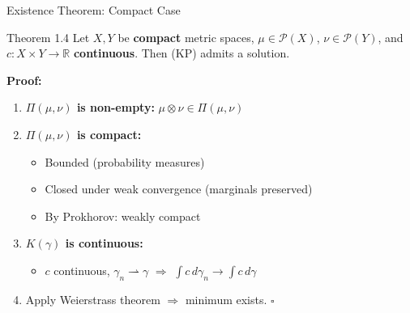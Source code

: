 \documentclass[aspectratio=169]{beamer}
\newcommand{\R}{\mathbb{R}}
\newcommand{\Pp}{\mathcal{P}}
\begin{document}
\begin{frame}{Existence Theorem: Compact Case}
\begin{block}{Theorem 1.4}
Let $X, Y$ be \textbf{compact} metric spaces, $\mu \in \Pp(X)$, $\nu \in \Pp(Y)$, and $c: X \times Y \to \R$ \textbf{continuous}. Then (KP) admits a solution.
\end{block}

\vspace{0.3cm}
\textbf{Proof:}
\begin{enumerate}
    \item \textbf{$\Pi(\mu,\nu)$ is non-empty:} $\mu \otimes \nu \in \Pi(\mu,\nu)$ \checkmark

    \item \textbf{$\Pi(\mu,\nu)$ is compact:}
    \begin{itemize}
        \item Bounded (probability measures)
        \item Closed under weak convergence (marginals preserved)
        \item By Prokhorov: weakly compact
    \end{itemize}

    \item \textbf{$K(\gamma)$ is continuous:}
    \begin{itemize}
        \item $c$ continuous, $\gamma_n \rightharpoonup \gamma$ $\Rightarrow$ $\int c \, d\gamma_n \to \int c \, d\gamma$
    \end{itemize}

    \item Apply Weierstrass theorem $\Rightarrow$ minimum exists. \quad $\square$
\end{enumerate}
\end{frame}
\end{document}
